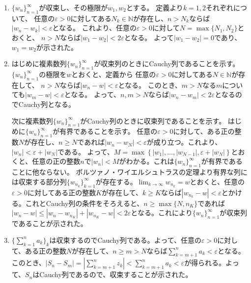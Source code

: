 \begin{kaitou*}
\begin{enumerate}
\item $\{w_{n}\}_{n=1}^{\infty}$が収束し、その極限が$w_{1},w_{2}$とする。
定義より$k=1,2$それぞれについて、
任意の$\varepsilon>0$に対してある$N_{k}\in\mathbb{N}$が存在し、$n>N_{k}$ならば
$|w_{n}-w_{k}|<\varepsilon$となる。
これより、任意の$\varepsilon>0$に対して$N=\max\{N_{1},N_{2}\}$とおくと、
$n>N$ならば$|w_{1}-w_{2}|<2\varepsilon$となる。
よって$|w_{1}-w_{2}|=0$であり、$w_{1}=w_{2}$が示された。
\item はじめに複素数列$\{w_{n}\}_{n=1}^{\infty}$が収束列のときにCauchy列であることを示す。
$\{w_{n}\}_{n=1}^{\infty}$の極限を$w$とおくと、定義から
任意の$\varepsilon>0$に対してある$N\in\mathbb{N}$が存在して、
$n>N$ならば$|w_{n}-w|<\varepsilon$となる。
このとき、$m>N$なる$m$についても$|w_{m}-w|<\varepsilon$となる。
よって、$n,m>N$ならば$|w_{n}-w_{m}|<2\varepsilon$となるのでCauchy列となる。

次に複素数列$\{w_{n}\}_{n=1}^{\infty}$がCauchy列のときに収束列であることを示す。
はじめに$\{w_{n}\}_{n=1}^{\infty}$が有界であることを示す。
任意の$\varepsilon>0$に対して、ある正の整数$N$が存在し、$n\ge N$であれば$|w_n-w_N|<\varepsilon$が成り立つ。これより、$|w_n|<\varepsilon + |w_N|$である。
よって、$M=\max\left\{|w_1|,\dots,|w_{N-1}|,\varepsilon + |w_N|\right\}$とおくと、任意の正の整数$n$で$|w_n|<M$がわかる。これは$\{w_{n}\}_{n=1}^{\infty}$が有界であることに他ならない。
ボルツァノ・ワイエルシュトラスの定理より有界な列には収束する部分列$\{w_{n_{k}}\}_{k=1}^{\infty}$が存在する。$\lim_{k\to\infty}w_{n_{k}}=w$とおくと、任意の$\varepsilon>0$に対してある正の整数$K$が存在して、$k\ge K$ならば$|w_{n_{k}}-w|<\varepsilon$とかける。これとCauchy列の条件をそろえると、$n\ge\max\{N,n_{K}\}$であれば$|w_{n}-w|\le|w_{n}-w_{n_{K}}|+|w_{n_{K}}-w|<2\varepsilon$となる。これにより$\{w_{n}\}_{n=1}^{\infty}$が収束列であることが示された。

\item $\{\sum_{k=1}^{n}a_k\}_{k}$は収束するのでCauchy列である。よって、任意の$\varepsilon>0$に対して、ある正の整数$N$が存在して、$n\ge m>N$ならば$\sum_{k=m+1}^{n}a_k<\varepsilon$となる。このとき、$|S_{n}-S_{m}|=|\sum_{k=m+1}^{n}z_{k}|<\sum_{k=m+1}^{n}a_k<\varepsilon$が得られる。よって、$S_{n}$はCauchy列であるので、収束することが示された。
\end{enumerate}
\end{kaitou*}